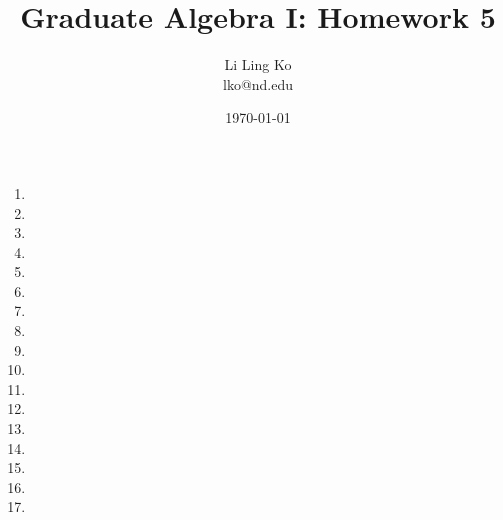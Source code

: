 \documentclass{article}
\begin{document}
\title{Graduate Algebra I: Homework 5}
\author{Li Ling Ko\\ lko@nd.edu}
\date{\today}
\maketitle

\begin{enumerate}
  \item 
  \item 
  \item 
  \item 

  \item 

  \item 
  \item 
  \item 
  \item 
  \item 

  \item 
  \item 
  \item 
  \item 
  \item 
  \item 

  \item 
\end{enumerate}
\end{document}
